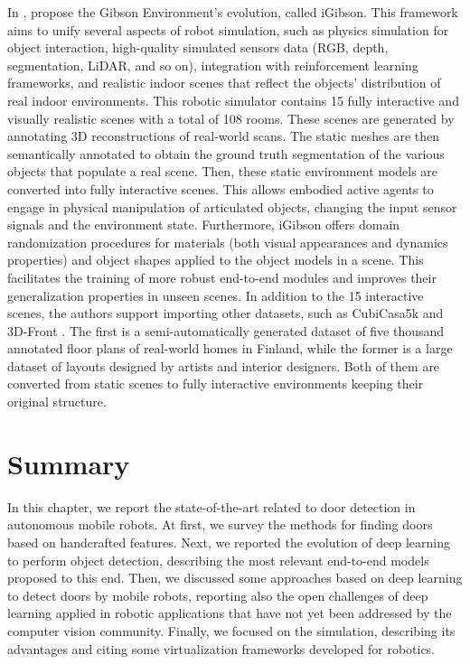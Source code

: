  In \cite{igibson}, \citeauthor{igibson} propose the Gibson Environment's evolution, called iGibson. This framework aims to unify several aspects of robot simulation, such as physics simulation for object interaction, high-quality simulated sensors data (RGB, depth, segmentation, LiDAR, and so on), integration with reinforcement learning frameworks, and realistic indoor scenes that reflect the objects' distribution of real indoor environments. This robotic simulator contains 15 fully interactive and visually realistic scenes with a total of 108 rooms. These scenes are generated  by annotating 3D reconstructions of real-world scans. The static meshes are then semantically annotated to obtain the ground truth segmentation of the various objects that populate a real scene. Then, these static environment models are converted into fully interactive scenes. This allows embodied active agents to engage in physical manipulation of articulated objects, changing the input sensor signals and the environment state. Furthermore, iGibson offers domain randomization procedures for materials (both visual appearances and dynamics properties) and object shapes applied to the object models in a scene. This facilitates the training of more robust end-to-end modules and improves their generalization properties in unseen scenes. In addition to the 15 interactive scenes, the authors support importing other datasets, such as CubiCasa5k \cite{cubicasa} and 3D-Front \cite{3dfront}. The first is a semi-automatically generated dataset of five thousand annotated floor plans of real-world homes in Finland, while the former is a large dataset of layouts designed by artists and interior designers. Both of them are converted from static scenes to fully interactive environments keeping their original structure. 
 
 \section{Summary}
 
 In this chapter, we report the state-of-the-art related to door detection in autonomous mobile robots. At first, we survey the methods for finding doors based on handcrafted features. Next, we reported the evolution of deep learning to perform object detection, describing the most relevant end-to-end models proposed to this end. Then, we discussed some approaches based on deep learning to detect doors by mobile robots, reporting also the open challenges of deep learning applied in robotic applications that have not yet been addressed by the computer vision community. Finally, we focused on the simulation, describing its advantages and citing some virtualization frameworks developed for robotics.
 

 